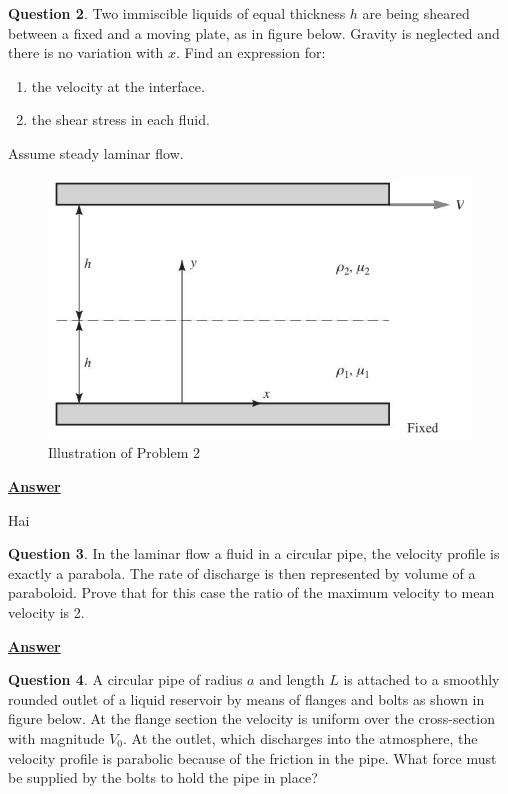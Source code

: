 \documentclass[10pt]{article}
\begin{document}
\break

\textbf{Question 2}. Two immiscible liquids of equal thickness $h$ are being sheared between a fixed and a moving plate, as in figure below. Gravity is neglected and there is no variation with $x$. Find an expression for:
\begin{enumerate}[label=\arabic*), noitemsep, nosep]
    \item the velocity at the interface.
    \item the shear stress in each fluid.
\end{enumerate}
Assume steady laminar flow.

\begin{figure}[h]
    \centering
    \includegraphics[scale=0.83]{Problem2.jpg}
    \caption{Illustration of Problem 2}
    \label{fig:figprob2}
\end{figure}

\textbf{\underline{Answer}}

Hai

\break

\textbf{Question 3}. In the laminar flow a fluid in a circular pipe, the velocity profile is exactly a parabola. The rate of discharge is then represented by volume of a paraboloid. Prove that for this case the ratio of the maximum velocity to mean velocity is 2.

\hfill

\textbf{\underline{Answer}}

\break

\textbf{Question 4}. A circular pipe of radius $a$ and length $L$ is attached to a smoothly rounded outlet of a liquid reservoir by means of flanges and bolts as shown in figure below. At the flange section the velocity is uniform over the cross-section with magnitude $V_0$. At the outlet, which discharges into the atmosphere, the velocity profile is parabolic because of the friction in the pipe. What force must be supplied by the bolts to hold the pipe in place?
\end{document}
